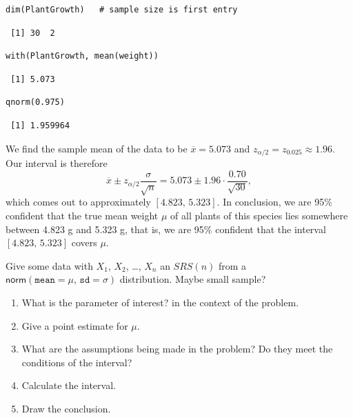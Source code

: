 \documentclass[captions=tableheading]{scrbook}
\begin{document}
\begin{verbatim}
dim(PlantGrowth)   # sample size is first entry
\end{verbatim}

\begin{verbatim}
 [1] 30  2
\end{verbatim}


\begin{verbatim}
with(PlantGrowth, mean(weight))
\end{verbatim}

\begin{verbatim}
 [1] 5.073
\end{verbatim}


\begin{verbatim}
qnorm(0.975)
\end{verbatim}

\begin{verbatim}
 [1] 1.959964
\end{verbatim}

We find the sample mean of the data to be \(\overline{x}=5.073\) and \(z_{\alpha/2}=z_{0.025}\approx1.96\). Our interval is therefore
\[
\overline{x}\pm z_{\alpha/2}\frac{\sigma}{\sqrt{n}}=5.073\pm1.96\cdot\frac{0.70}{\sqrt{30}},
\]
which comes out to approximately \([4.823,\,5.323]\). In conclusion, we are 95\% confident that the true mean weight \(\mu\) of all plants of this species lies somewhere between 4.823 g and 5.323 g, that is, we are 95\% confident that the interval \([4.823,\,5.323]\) covers \(\mu\).

\begin{example}
Give some data with \(X_{1}\), \(X_{2}\), \ldots{}, \(X_{n}\) an \(SRS(n)\) from a \(\mathsf{norm}(\mathtt{mean}=\mu,\,\mathtt{sd}=\sigma)\) distribution. Maybe small sample?
\end{example}

\begin{enumerate}
\item What is the parameter of interest? in the context of the problem.
\item Give a point estimate for \(\mu\).
\item What are the assumptions being made in the problem? Do they meet the conditions of the interval?
\item Calculate the interval.
\item Draw the conclusion.
\end{enumerate}
\end{document}
